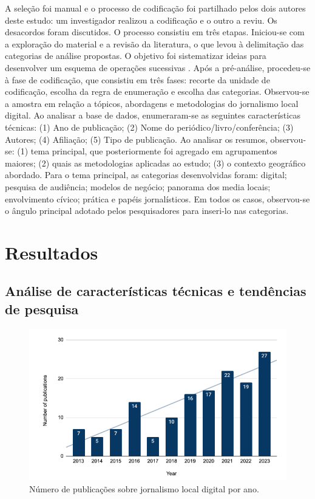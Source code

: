 \documentclass[portuguese]{textolivre}
\begin{document}
A seleção foi manual e o processo de codificação foi partilhado pelos dois autores deste estudo: um investigador realizou a codificação e o outro a reviu. Os desacordos foram discutidos. O processo consistiu em três etapas. Iniciou-se com a exploração do material e a revisão da literatura, o que levou à delimitação das categorias de análise propostas. O objetivo foi sistematizar ideias para desenvolver um esquema de operações sucessivas \cite{bardin1977}. Após a pré-análise, procedeu-se à fase de codificação, que consistiu em três fases: recorte da unidade de codificação, escolha da regra de enumeração e escolha das categorias. Observou-se a amostra em relação a tópicos, abordagens e metodologias do jornalismo local digital. Ao analisar a base de dados, enumeraram-se as seguintes características técnicas: (1) Ano de publicação; (2) Nome do periódico/livro/conferência; (3) Autores; (4) Afiliação; (5) Tipo de publicação. Ao analisar os resumos, observou-se: (1) tema principal, que posteriormente foi agregado em agrupamentos maiores; (2) quais as metodologias aplicadas ao estudo; (3) o contexto geográfico abordado. Para o tema principal, as categorias desenvolvidas foram: digital; pesquisa de audiência; modelos de negócio; panorama dos media locais; envolvimento cívico; prática e papéis jornalísticos. Em todos os casos, observou-se o ângulo principal adotado pelos pesquisadores para inseri-lo nas categorias.

\section{Resultados}

\subsection{Análise de características técnicas e tendências de pesquisa}

\begin{figure}[htbp]
\centering
\begin{minipage}{0.75\textwidth}
\includegraphics[width =\textwidth]{Imagens/Fig1.png}
\caption{Número de publicações sobre jornalismo local digital por ano.}
\label{fig-1}
\end{minipage}
\end{figure}
\end{document}
